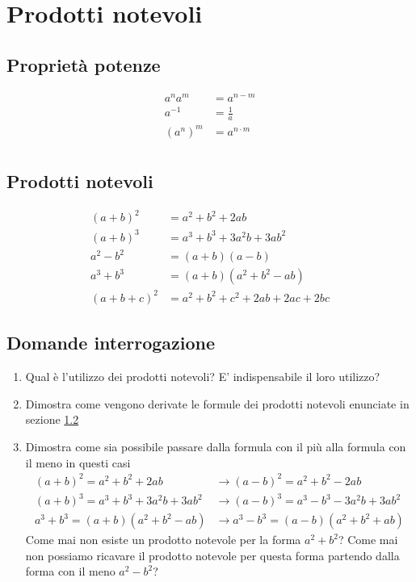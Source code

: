 \section{Prodotti notevoli}

\subsection{Proprietà potenze}
\begin{align*}
	a^{n}a^{m}             & = a^{n-m}        \\[12pt]
	a^{-1}                 & = \frac{1}{a}    \\[12pt]
	\left(a^{n}\right)^{m} & = a^{n \cdot  m} \\[12pt]
\end{align*}
\subsection{Prodotti notevoli}\label{prodnotevoli}
\begin{align*}
	\left(a + b\right)^2 & = a^2  + b ^2  +2ab                           \\[12pt]
	\left(a + b\right)^3 & = a^3  + b^3 +3a^2 b + 3 a b^2                \\[12pt]
	a^2  - b^2           & = \left(a+b\right)\left(a-b\right)            \\[12pt]
	a^3 + b^3            & = \left(a + b\right)\left(a^2 +b^2 -ab\right) \\[12pt]
	\left(a+b+c\right)^2 & = a^2  + b^2  + c^2 +2ab + 2ac + 2bc
\end{align*}
\subsection{Domande interrogazione}
\begin{enumerate}
	\item Qual è l'utilizzo dei prodotti notevoli? E' indispensabile il loro utilizzo?
	\item Dimostra come vengono derivate le formule dei prodotti notevoli enunciate in sezione \ref{prodnotevoli}
	\item Dimostra come sia possibile passare dalla formula con il più alla formula con il meno in questi casi
	      \begin{align*}
		      \left(a+b\right)^2 = a^2  + b^2 + 2ab                      & \rightarrow \left(a-b\right)^2 =a^2  + b^2 - 2ab                      \\
		      \left(a + b\right)^3 = a^3  + b^3 +3a^2 b + 3 a b^2        & \rightarrow \left(a - b\right)^3 = a^3  - b^3 -3a^2 b + 3 a b^2       \\
		      a^3  + b^3 = \left(a+b\right)\left(a^2  + b^2  - ab\right) & \rightarrow a^3  - b^3 =  \left(a-b\right)\left(a^2  + b^2 +ab\right)
	      \end{align*}
	      Come mai non esiste un prodotto notevole per la forma $ a^2  + b^2  $? Come mai non possiamo ricavare il prodotto notevole per questa forma partendo dalla forma con il meno $ a^2  - b^2  $?
\end{enumerate}

